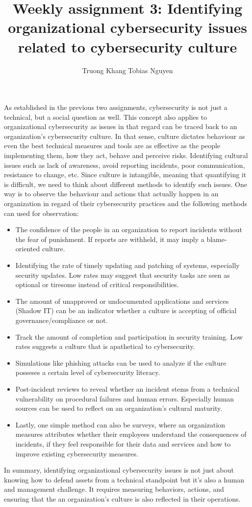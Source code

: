 \documentclass[12pt]{article}
\title{Weekly assignment 3: Identifying organizational cybersecurity issues related to cybersecurity culture}
\author{Truong Khang Tobias Nguyen}
\date{}
\begin{document}
\maketitle

As established in the previous two assignments, cybersecurity is not just a technical, but a social question as well. This concept also applies to organizational cybersecurity as issues in that regard can be traced back to an organization's cybersecurity culture.
\newline
In that sense, culture dictates behaviour as even the best technical measures and tools are as effective as the people implementing them, how they act, behave and perceive risks. Identifying cultural issues such as lack of awareness, avoid reporting incidents, poor communication, resistance to change, etc. 
\newline
Since culture is intangible, meaning that quantifying it is difficult, we need to think about different methods to identify such issues.
\newline
One way is to observe the behaviour and actions that actually happen in an organization in regard of their cybersecurity practices and the following methods can used for observation:
\begin{itemize}
\item The confidence of the people in an organization to report incidents without the fear of punishment. If reports are withheld, it may imply a blame-oriented culture.
\item  Identifying the rate of timely updating and patching of systems, especially security updates. Low rates may suggest that security tasks are seen as optional or tiresome instead of critical responsibilities.
\item The amount of unapproved or undocumented applications and services (Shadow IT) can be an indicator whether a culture is accepting of official governance/compliance or not.
\item Track the amount of completion and participation in security training. Low rates suggests a culture that is apathetical to cybersecurity.
\item Simulations like phishing attacks can be used to analyze if the culture posseses a certain level of cybersecurity literacy.
\item Post-incident reviews to reveal whether an incident stems from a technical vulnerability on procedural failures and human errors. Especially human sources can be used to reflect on an organization's cultural maturity.
\item Lastly, one simple method can also be surveys, where an organization measures attributes whether their employees understand the consequences of incidents, if they feel responsible for their data and services and how to improve existing cybersecurity measures.
\end{itemize}
In summary, identifying organizational cybersecurity issues is not just about knowing how to defend assets from a technical standpoint but it's also a human and management challenge. 
\newline
It requires measuring behaviors, actions, and ensuring that the an organization's culture is also reflected in their operations.
\end{document}
